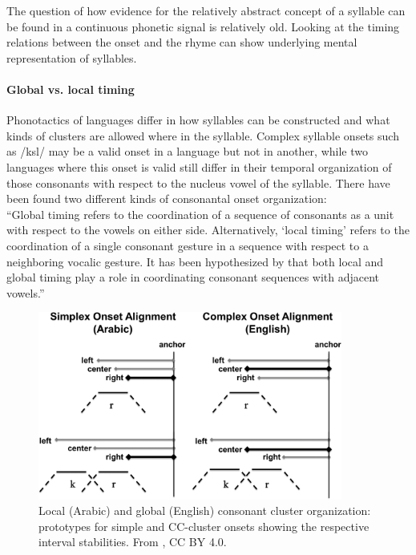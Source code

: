 \documentclass[../Proposal.tex]{subfiles}
\begin{document}
\label{sec:lit}





The question of how evidence for the relatively abstract concept of a syllable can be found in a continuous phonetic signal is relatively old. 
Looking at the timing relations between the onset and the rhyme can show underlying mental representation of syllables.
\paragraph{Global vs. local timing}
Phonotactics of languages differ in how syllables can be constructed and what kinds of clusters are allowed where in the syllable. Complex syllable onsets such as /ksl/ may be a valid onset in a language but not in another, while two languages where this onset is valid still differ in their temporal organization of those consonants with respect to the nucleus vowel of the syllable. There have been found two different kinds of consonantal onset organization: \\
\hspace{2cm}\enquote{Global timing refers
to the coordination of a sequence of consonants as a unit with respect to the vowels on
either side. Alternatively, ‘local timing’ refers
to the coordination of a single consonant gesture in a sequence with respect to a neighboring vocalic gesture. It has been hypothesized
by \cite[]{browman1988some} that both
local and global timing play a role in coordinating consonant sequences with adjacent
vowels.} \cite[286]{byrd1995c}\\

\begin{figure}
    \centering
    \includegraphics[width=10cm]{figures/onset_alignment.png}
    \caption{Local (Arabic) and global (English) consonant cluster organization: prototypes for simple and CC-cluster onsets showing the respective interval stabilities. From \cite{shaw2015stochastic}, CC BY 4.0.}
    \label{fig:onset_alignment}
\end{figure}
\end{document}
